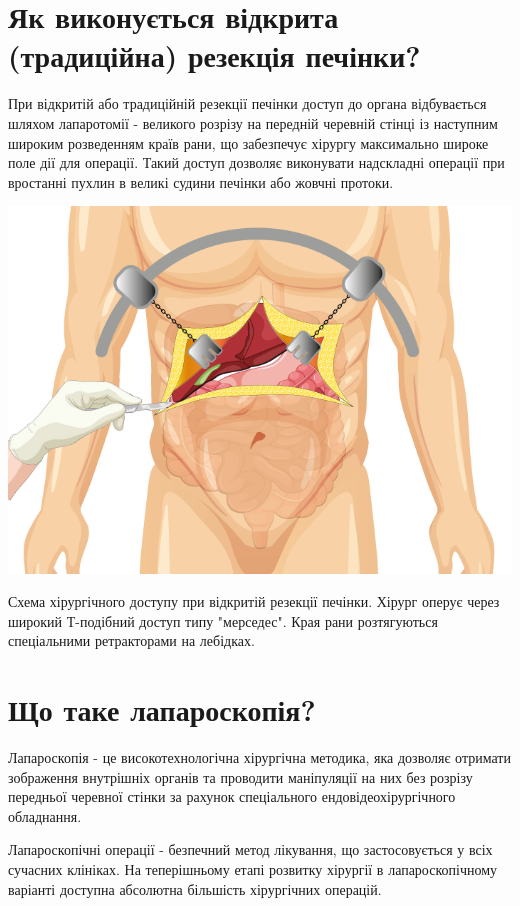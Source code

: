 \newpage
\section{Як виконується відкрита (традиційна) резекція печінки?}

При відкритій або традиційній резекції печінки доступ до органа відбувається шляхом лапаротомії - великого розрізу на передній черевній стінці із наступним широким розведенням країв рани, що забезпечує хірургу максимально широке поле дії для операції. Такий доступ дозволяє виконувати надскладні операції при вростанні пухлин в великі судини печінки або жовчні протоки. 

\begin{marginfigure}[10pt]%
  \includegraphics[width=\linewidth]{Figures/LapVsOpen_Open surgery.png}
  \caption{Схема хірургічного доступу при відкритій резекції печінки. Хірург оперує через широкий Т-подібний доступ типу "мерседес". Края рани розтягуються спеціальними ретракторами на лебідках.}
  \label{fig:crlm}
\end{marginfigure}

\section{Що таке лапароскопія?}

Лапароскопія  - це високотехнологічна хірургічна методика, яка дозволяє отримати зображення внутрішніх органів та проводити маніпуляції на них без розрізу передньої черевної стінки за рахунок спеціального ендовідеохірургічного обладнання.

Лапароскопічні операції - безпечний метод лікування, що застосовується у всіх сучасних клініках. На теперішньому етапі розвитку хірургії в лапароскопічному варіанті доступна абсолютна більшість хірургічних операцій. 

